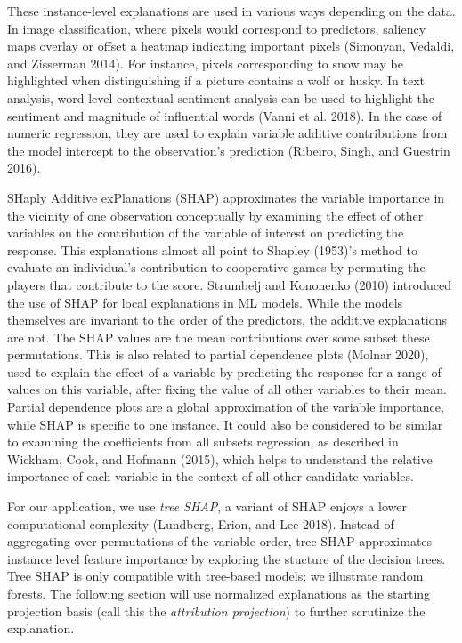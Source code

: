 \documentclass[
]{article}
\begin{document}
These instance-level explanations are used in various ways depending on the data. In image classification, where pixels would correspond to predictors, saliency maps overlay or offset a heatmap indicating important pixels (Simonyan, Vedaldi, and Zisserman 2014). For instance, pixels corresponding to snow may be highlighted when distinguishing if a picture contains a wolf or husky. In text analysis, word-level contextual sentiment analysis can be used to highlight the sentiment and magnitude of influential words (Vanni et al. 2018). In the case of numeric regression, they are used to explain variable additive contributions from the model intercept to the observation's prediction (Ribeiro, Singh, and Guestrin 2016).

SHaply Additive exPlanations (SHAP) approximates the variable importance in the vicinity of one observation conceptually by examining the effect of other variables on the contribution of the variable of interest on predicting the response. This explanations almost all point to Shapley (1953)'s method to evaluate an individual's contribution to cooperative games by permuting the players that contribute to the score. Strumbelj and Kononenko (2010) introduced the use of SHAP for local explanations in ML models. While the models themselves are invariant to the order of the predictors, the additive explanations are not. The SHAP values are the mean contributions over some subset these permutations. This is also related to partial dependence plots (Molnar 2020), used to explain the effect of a variable by predicting the response for a range of values on this variable, after fixing the value of all other variables to their mean. Partial dependence plots are a global approximation of the variable importance, while SHAP is specific to one instance. It could also be considered to be similar to examining the coefficients from all subsets regression, as described in Wickham, Cook, and Hofmann (2015), which helps to understand the relative importance of each variable in the context of all other candidate variables.

For our application, we use \emph{tree SHAP}, a variant of SHAP enjoys a lower computational complexity (Lundberg, Erion, and Lee 2018). Instead of aggregating over permutations of the variable order, tree SHAP approximates instance level feature importance by exploring the stucture of the decision trees. Tree SHAP is only compatible with tree-based models; we illustrate random forests. The following section will use normalized explanations as the starting projection basis (call this the \emph{attribution projection}) to further scrutinize the explanation.
\end{document}
